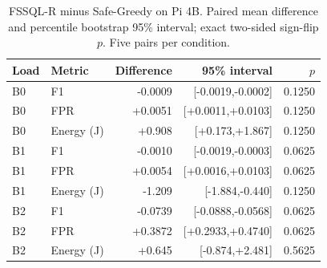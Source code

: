\begin{table}[t]
\caption{FSSQL-R minus Safe-Greedy on Pi 4B. Paired mean difference and percentile bootstrap 95\% interval; exact two-sided sign-flip $p$. Five pairs per condition.}
\label{tab:paired}
\centering\scriptsize
\setlength{\tabcolsep}{3pt}
\begin{tabular}{llrrr}
\toprule
Load & Metric & Difference & 95\% interval & $p$ \\
\midrule
B0 & F1 & -0.0009 & [-0.0019,-0.0002] & 0.1250 \\
B0 & FPR & +0.0051 & [+0.0011,+0.0103] & 0.1250 \\
B0 & Energy (J) & +0.908 & [+0.173,+1.867] & 0.1250 \\
B1 & F1 & -0.0010 & [-0.0019,-0.0003] & 0.0625 \\
B1 & FPR & +0.0054 & [+0.0016,+0.0103] & 0.0625 \\
B1 & Energy (J) & -1.209 & [-1.884,-0.440] & 0.1250 \\
B2 & F1 & -0.0739 & [-0.0888,-0.0568] & 0.0625 \\
B2 & FPR & +0.3872 & [+0.2933,+0.4740] & 0.0625 \\
B2 & Energy (J) & +0.645 & [-0.874,+2.481] & 0.5625 \\
\bottomrule
\end{tabular}
\end{table}
